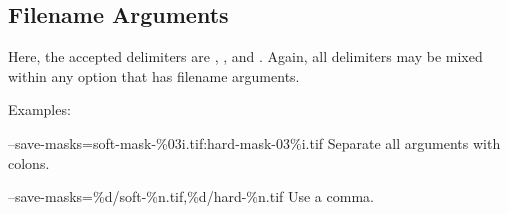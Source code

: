 \subsection[Filename Arguments]{Filename Arguments
  \label{sec:option-delimiters-filename-arguments}
  }

Here, the accepted delimiters are \sample{,}, \sample{;}, and
\sample{:}.  Again, all delimiters may be mixed within any option that
has filename arguments.

Examples:

\begin{codelist}
\item[--save-masks=soft-mask-\%03i.tif:hard-mask-03\%i.tif]\itemend Separate
  all arguments with colons.

\item[--save-masks=\%d/soft-\%n.tif,\%d/hard-\%n.tif]\itemend Use a
  comma.
\end{codelist}
